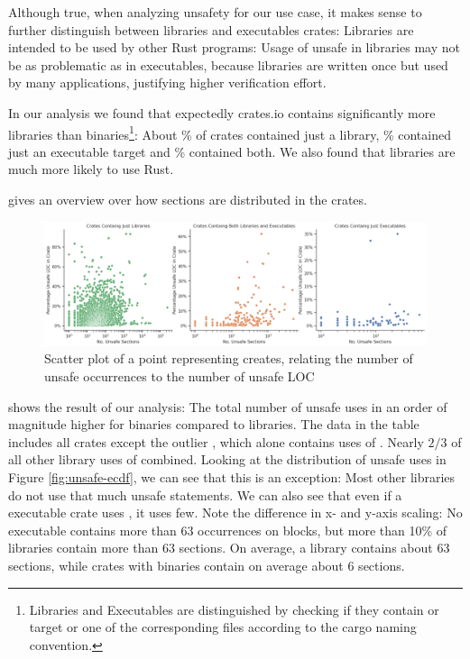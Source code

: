 \documentclass[twoside, english]{sdqthesis}
\theoremstyle{definition}
\begin{document}
Although true, when analyzing unsafety for our use case, it makes sense to further distinguish between libraries and executables crates: Libraries are intended to be used by other Rust programs: Usage of unsafe in libraries may not be as problematic as in executables, because libraries are written once but used by many applications, justifying higher verification effort. 

In our analysis we found that expectedly crates.io contains significantly more libraries than binaries\footnote{Libraries and Executables are distinguished by checking if they contain  or  target or one of the corresponding files according to the cargo naming convention.}: About \% of crates contained just a library, \% contained just an executable target and \% contained both. 
We also found that libraries are much more likely to use  Rust.


 gives an overview over how  sections are distributed in the crates.
\begin{figure}[h]
	\centering
	\includegraphics[width=0.99\linewidth, clip, trim={0.2cm 0.2cm 0.2cm 0.2cm}]{../scatter-occurences-vs-loc.png}
	\caption{Scatter plot of a point representing creates, relating the number of unsafe occurrences to the number of unsafe LOC}
	\label{fig:unsafe-scatter}
\end{figure}

 shows the result of our analysis: The total number of unsafe uses in an order of magnitude higher for binaries compared to libraries.
The data in the table includes all crates except the outlier , which alone contains  uses of . Nearly $2 / 3$ of all other library uses of  combined.
Looking at the distribution of unsafe uses in Figure \ref{fig:unsafe-ecdf}, we can see that this is an exception: Most other libraries do not use that much unsafe statements. We can also see that even if a executable crate uses , it uses few. Note the difference in x- and y-axis scaling: No executable contains more than 63 occurrences on  blocks, but more than 10\% of libraries contain more than 63  sections.
On average, a library contains about 63  sections, while crates with binaries contain on average about 6  sections.
\end{document}
